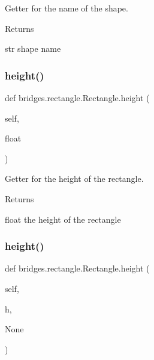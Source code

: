 Getter for the name of the shape. 

\begin{DoxyReturn}{Returns}


str shape name 
\end{DoxyReturn}
\mbox{\label{classbridges_1_1rectangle_1_1_rectangle_a74a2af961f5eb512ccd5f7faded6645c}} 
\subsubsection{\texorpdfstring{height()}{height()}\hspace{0.1cm}{\footnotesize\ttfamily [1/2]}}
{\footnotesize\ttfamily def bridges.\+rectangle.\+Rectangle.\+height (\begin{DoxyParamCaption}\item[{}]{self,  }\item[{}]{float }\end{DoxyParamCaption})}



Getter for the height of the rectangle. 

\begin{DoxyReturn}{Returns}


float the height of the rectangle 
\end{DoxyReturn}
\mbox{\label{classbridges_1_1rectangle_1_1_rectangle_ad150b377d0bc9f08c85f7f16643a6bf4}} 
\subsubsection{\texorpdfstring{height()}{height()}\hspace{0.1cm}{\footnotesize\ttfamily [2/2]}}
{\footnotesize\ttfamily def bridges.\+rectangle.\+Rectangle.\+height (\begin{DoxyParamCaption}\item[{}]{self,  }\item[{}]{h,  }\item[{}]{None }\end{DoxyParamCaption})}



